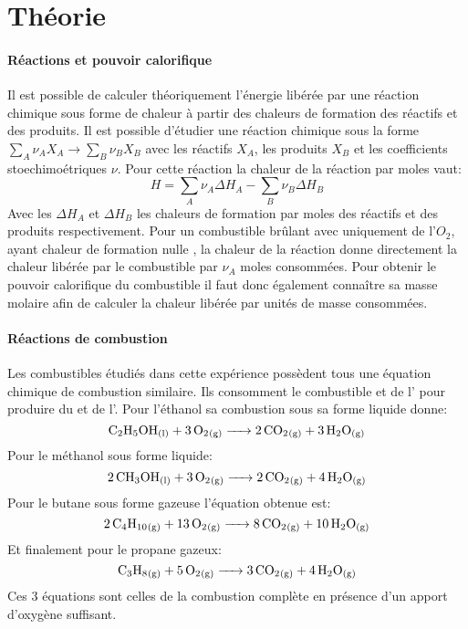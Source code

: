 \section{Théorie}


\paragraph*{Réactions et pouvoir calorifique}
Il est possible de calculer théoriquement l'énergie libérée par une réaction chimique sous forme de chaleur à partir des chaleurs de formation des réactifs et des produits. Il est possible d'étudier une réaction chimique sous la forme \(\sum_{A} \nu_A X_A \to \sum_{B} \nu_B X_B\) avec les réactifs \(X_A\), les produits \(X_B\) et les coefficients stoechimoétriques \(\nu\). Pour cette réaction la chaleur de la réaction par moles vaut:
\begin{equation}
    H = \sum_{A} \nu_A \Delta H_A - \sum_{B} \nu_B \Delta H_B
    \label{eq:chaleur_réaction}
\end{equation}
Avec les \(\Delta H_A\) et \(\Delta H_B\) les chaleurs de formation par moles des réactifs et des produits respectivement. Pour un combustible brûlant avec uniquement de l'\(O_2\), ayant chaleur de formation nulle \cite{notice}, la chaleur de la réaction donne directement la chaleur libérée par le combustible par \(\nu_A\) moles consommées. Pour obtenir le pouvoir calorifique du combustible il faut donc également connaître sa masse molaire afin de calculer la chaleur libérée par unités de masse consommées.

\paragraph*{Réactions de combustion}
Les combustibles étudiés dans cette expérience possèdent tous une équation chimique de combustion similaire. Ils consomment le combustible et de l' pour produire du  et de l'. Pour l'éthanol  sa combustion sous sa forme liquide donne:
\begin{equation}
    \ce{ C_2H_5OH_{(l)} + 3O_2_{(g)} -> 2CO_2_{(g)} + 3H_2O_{(g)} }
    \label{eq:ethanol_combustion}
\end{equation}
Pour le méthanol  sous forme liquide:
\begin{equation}
    \ce{ 2CH3OH_{(l)} + 3O_2_{(g)} -> 2CO_2_{(g)} + 4H_2O_{(g)} }
    \label{eq:methanol_combustion}
\end{equation}
Pour le butane  sous forme gazeuse l'équation obtenue est:
\begin{equation}
    \ce{ 2C_4H_{10}_{(g)} + 13O_2_{(g)} -> 8CO_2_{(g)} + 10H_2O_{(g)} }
    \label{eq:butane_combustion}
\end{equation}
Et finalement pour le propane  gazeux:
\begin{equation}
    \ce{ C_3H_8_{(g)} + 5O_2_{(g)} -> 3CO_2_{(g)} + 4H_2O_{(g)} }
    \label{eq:propane_combustion}
\end{equation}
Ces 3 équations sont celles de la combustion complète en présence d'un apport d'oxygène suffisant.

